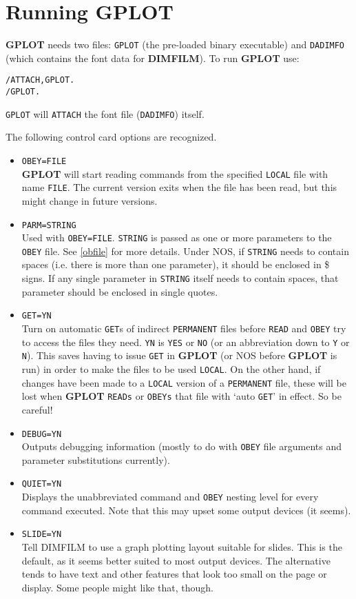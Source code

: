 \documentclass[a4paper,twoside,11pt]{article}
\newcommand{\newpara}{\par\vspace{4mm}\noindent}
\newcommand{\textttc}[1]{\texttt{\textcolor{OurRed}{#1}}}
\begin{document}
\section{Running \textbf{GPLOT}}
\textbf{GPLOT} needs two files: \texttt{GPLOT} (the pre-loaded binary executable) 
and \texttt{DADIMFO} (which contains
the font data for \textbf{DIMFILM}). To run \textbf{GPLOT} use:
\begin{verbatim}
/ATTACH,GPLOT.
/GPLOT.
\end{verbatim}
\texttt{GPLOT} will \texttt{ATTACH} the font file (\texttt{DADIMFO}) itself.
\newpara
The following control card options are recognized.
\begin{itemize}
\item \textttc{OBEY=FILE}\\
   \textbf{GPLOT} will start reading commands from the specified \texttt{LOCAL} file with name \texttt{FILE}. 
   The current version exits when the file
   has been read, but this might change in future versions.
\item \textttc{PARM=STRING}\\
   Used with \texttt{OBEY=FILE}. \texttt{STRING} is passed as one or more parameters to the \texttt{OBEY} file.
    See \ref{obfile} for more details.
   Under NOS, if \texttt{STRING} needs to contain spaces (i.e. there is more than one parameter), it should be enclosed in
   \$ signs. If any single parameter in \texttt{STRING} itself needs to contain spaces, that parameter should be enclosed in
   single quotes.
\item \textttc{GET=YN}\\
   Turn on automatic \texttt{GET}s of indirect \texttt{PERMANENT} files before \texttt{READ} and \texttt{OBEY} 
   try to access the files they need. \texttt{YN} is
   \texttt{YES} or \texttt{NO} (or an abbreviation down to \texttt{Y} or \texttt{N}). 
   This saves having to issue \texttt{GET} in \textbf{GPLOT} (or NOS before \textbf{GPLOT} is
   run) in order to make the files to be used \texttt{LOCAL}. On the other hand, if changes have been made to a \texttt{LOCAL} version
   of a \texttt{PERMANENT} file, these will be lost when \textbf{GPLOT} \texttt{READs} or \texttt{OBEYs} 
   that file with `auto \texttt{GET}' in effect. So be 
   careful!
\item \textttc{DEBUG=YN}\\
   Outputs debugging information (mostly to do with \texttt{OBEY} file arguments and parameter substitutions currently).
\item \textttc{QUIET=YN}\\
   Displays the unabbreviated command and \texttt{OBEY} nesting level for every command executed. Note that this may
   upset some output devices (it seems).
\item \textttc{SLIDE=YN}\\
	Tell DIMFILM to use a graph plotting layout suitable for slides. This is the default, as it seems better suited to most
	output devices. The alternative tends to have text and other features that look too small on the page or display. Some
	people might like that, though. 
\end{itemize}
\end{document}
